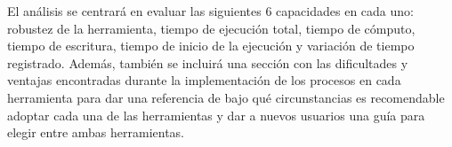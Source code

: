 El análisis se centrará en evaluar las siguientes 6 capacidades en cada uno: robustez de la herramienta, tiempo de ejecución total, tiempo de cómputo, tiempo de escritura, tiempo de inicio de la ejecución y variación de tiempo registrado. Además, también se incluirá una sección con las dificultades y ventajas encontradas durante la implementación de los procesos en cada herramienta para dar una referencia de bajo qué circunstancias es recomendable adoptar cada una de las herramientas y dar a nuevos usuarios una guía para elegir entre ambas herramientas. 

